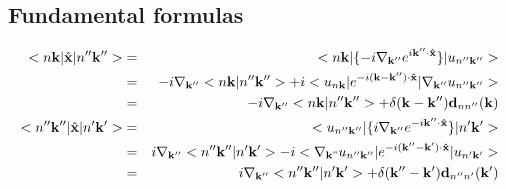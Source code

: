 \documentclass[aps,prb,preprint]{revtex4-1}
\begin{document}
\begin{appendix} \footnotesize
\section{Fundamental formulas}
%
\begin{eqnarray}
<n{\bf k}|\hat{\bf x}|n''{\bf k''}>&=& <n{\bf k}| \{ -i \nabla_{\bf k''} e^{i{\bf k'' \cdot \hat{x} }} \} |u_{n''{\bf k''}}>\nonumber \\
&=&  -i \nabla_{\bf k''} <n{\bf k}|n''{\bf k''}> + i <u_{n{\bf k}}| e^{-i{\bf (k-k'') \cdot \hat{x} }} |\nabla_{\bf k''} u_{n''{\bf k''}}>\nonumber \\
&=&  -i \nabla_{\bf k''} <n{\bf k}|n''{\bf k''}> + \delta({\bf k-k''}) {\bf d}_{nn''}({\bf k}) \\
<n''{\bf k''}|\hat{\bf x}|n'{\bf k'}>&=& <u_{n''{\bf k''}}| \{ i \nabla_{\bf k''} e^{-i{\bf k'' \cdot \hat{x} }} \} |n'{\bf k'}>\nonumber \\
&=&  i \nabla_{\bf k''} <n''{\bf k''}|n'{\bf k'}> - i <\nabla_{\bf k"} u_{n''{\bf k''}}| e^{-i{\bf (k''-k') \cdot \hat{x} }} |u_{n'{\bf k'}}>\nonumber \\
&=&  i \nabla_{\bf k''} <n''{\bf k''}|n'{\bf k'}> + \delta({\bf k''-k'}) {\bf d}_{n''n'}({\bf k'})
\end{eqnarray} 


\end{appendix}
\end{document}
